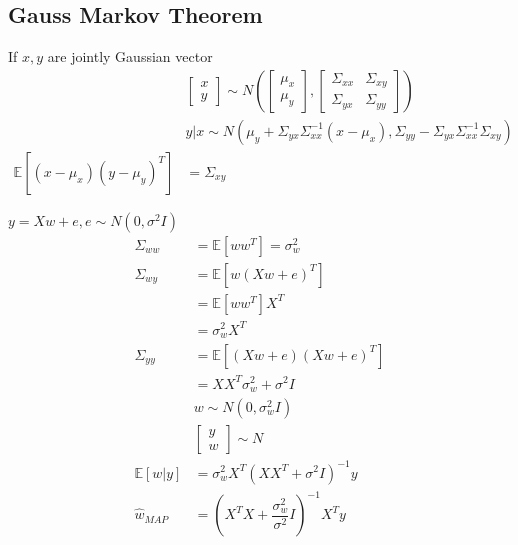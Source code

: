 \documentclass{article}
\begin{document}
\subsection{Gauss Markov Theorem}
If $x , y $ are jointly Gaussian vector
\begin{align*}
&\begin{bmatrix} x \\ y \end{bmatrix} \sim  N\left(\begin{bmatrix} \mu_{x} \\ \mu_{y} \end{bmatrix} , \begin{bmatrix} \Sigma_{x x} & \Sigma_{xy} \\ \Sigma_{yx} & \Sigma_{yy} \end{bmatrix} \right)
\\ &y  | x \sim  N\left(\mu_{y} + \Sigma_{yx} \Sigma_{x x}^{-1}\left(x - \mu_{x}\right), \Sigma_{yy} - \Sigma_{yx} \Sigma_{x x}^{-1} \Sigma_{xy}\right)
\\ \mathbb{E}\left[\left(x - \mu_{x}\right)\left(y - \mu_{y}\right)^{T}\right] &= \Sigma_{xy}
\end{align*}
\begin{eg} \label{eg:gmt} 
$y  = X w + e, e \sim  N\left(0, \sigma^{2} I \right)$
\begin{align*}
\Sigma_{ww} &= \mathbb{E}\left[w w^{T}\right] = \sigma_{w}^{2}
\\ \Sigma_{wy} &= \mathbb{E}\left[w \left(X w + e\right)^{T}\right]
\\ &= \mathbb{E}\left[w w^{T}\right] X^{T}
\\ &= \sigma_{w}^{2} X^{T}
\\ \Sigma_{yy} &= \mathbb{E}\left[\left(X w + e\right)\left(X w + e\right)^{T}\right]
\\ &= X X^{T} \sigma_{w}^{2} + \sigma^{2} I 
\\ &  w  \sim  N\left(0, \sigma_{w}^{2} I \right)
\\ &  \begin{bmatrix} y \\ w \end{bmatrix} \sim  N 
\\ \mathbb{E}\left[w | y\right] &= \sigma_{w}^{2} X^{T} \left(X X^{T} + \sigma^{2} I\right)^{-1} y 
\\ \hat{w}_{MAP} &= \left(X^{T} X + \dfrac{\sigma_{w}^{2}}{\sigma^{2}} I\right)^{-1} X^{T} y 
\end{align*}\end{eg}
\end{document}
